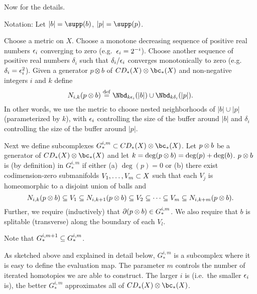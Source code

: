 \medskip

Now for the details.

Notation: Let $|b| = \supp(b)$, $|p| = \supp(p)$.

Choose a metric on $X$.
Choose a monotone decreasing sequence of positive real numbers $\epsilon_i$ converging to zero
(e.g.\ $\epsilon_i = 2^{-i}$).
Choose another sequence of positive real numbers $\delta_i$ such that $\delta_i/\epsilon_i$
converges monotonically to zero (e.g.\ $\delta_i = \epsilon_i^2$).
Given a generator $p\otimes b$ of $CD_*(X)\otimes \bc_*(X)$ and non-negative integers $i$ and $k$
define
\[
	N_{i,k}(p\ot b) \deq \Nbd_{k\ep_i}(|b|) \cup \Nbd_{k\delta_i}(|p|).
\]
In other words, we use the metric to choose nested neighborhoods of $|b|\cup |p|$ (parameterized
by $k$), with $\epsilon_i$ controlling the size of the buffer around $|b|$ and $\delta_i$ controlling
the size of the buffer around $|p|$.

Next we define subcomplexes $G_*^{i,m} \sub CD_*(X)\otimes \bc_*(X)$.
Let $p\otimes b$ be a generator of $CD_*(X)\otimes \bc_*(X)$ and let $k = \deg(p\otimes b)
= \deg(p) + \deg(b)$.
$p\otimes b$ is (by definition) in $G_*^{i,m}$ if either (a) $\deg(p) = 0$ or (b)
there exist codimension-zero submanifolds $V_1,\ldots,V_m \subset X$ such that each $V_j$
is homeomorphic to a disjoint union of balls and
\[
	N_{i,k}(p\otimes b) \subseteq V_1 \subseteq N_{i,k+1}(p\otimes b)
			\subseteq V_2 \subseteq \cdots \subseteq V_m \subseteq N_{i,k+m}(p\otimes b) .
\]
Further, we require (inductively) that $\partial(p\otimes b) \in G_*^{i,m}$.
We also require that $b$ is splitable (transverse) along the boundary of each $V_l$.

Note that $G_*^{i,m+1} \subseteq G_*^{i,m}$.

As sketched above and explained in detail below, 
$G_*^{i,m}$ is a subcomplex where it is easy to define
the evaluation map.
The parameter $m$ controls the number of iterated homotopies we are able to construct.
The larger $i$ is (i.e.\ the smaller $\epsilon_i$ is), the better $G_*^{i,m}$ approximates all of
$CD_*(X)\ot \bc_*(X)$.

